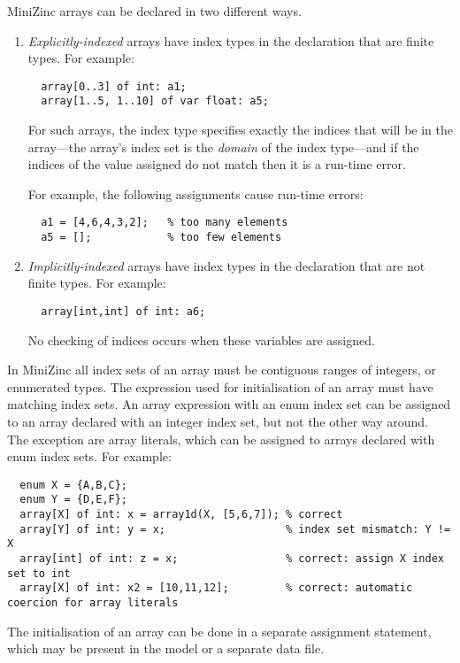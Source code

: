 \documentclass[10pt]{scrartcl}
\begin{document}
MiniZinc arrays can be declared in two different ways.
\begin{enumerate}
\item
    \emph{Explicitly-indexed} arrays have index types in the declaration
    that are finite types.  For example:
\begin{verbatim}
  array[0..3] of int: a1;
  array[1..5, 1..10] of var float: a5;
\end{verbatim}
    For such arrays, the index type specifies exactly the indices that will
    be in the array---the array's index set is the \emph{domain} of the
    index type---and if the indices of the value assigned do not match then
    it is a run-time error.

    For example, the following assignments cause run-time errors:
\begin{verbatim}
  a1 = [4,6,4,3,2];   % too many elements
  a5 = [];            % too few elements
\end{verbatim}

\item
    \emph{Implicitly-indexed} arrays have index types in the declaration
    that are not finite types.  For example:
\begin{verbatim}
  array[int,int] of int: a6;
\end{verbatim}
    No checking of indices occurs when these variables are assigned.
\end{enumerate}

In MiniZinc all index sets of an array must be contiguous ranges of integers, or enumerated types. The expression used for initialisation of
an array must have matching index sets. An array expression with an enum
index set can be assigned to an array declared with an integer index set,
but not the other way around. The exception are array literals, which can
be assigned to arrays declared with enum index sets.
For example:
\begin{verbatim}
  enum X = {A,B,C};
  enum Y = {D,E,F};
  array[X] of int: x = array1d(X, [5,6,7]); % correct
  array[Y] of int: y = x;                   % index set mismatch: Y != X
  array[int] of int: z = x;                 % correct: assign X index set to int
  array[X] of int: x2 = [10,11,12];         % correct: automatic coercion for array literals
\end{verbatim}

The initialisation of an array can be done in a separate assignment
statement, which may be present in the model or a separate data file.
\end{document}
